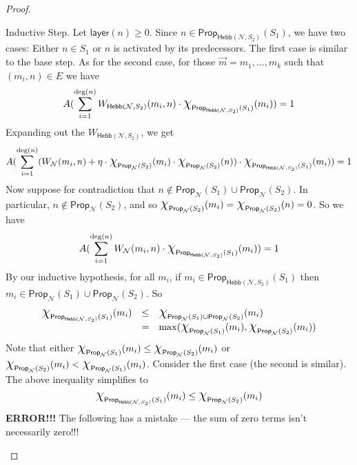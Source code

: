 \documentclass[letterpaper]{article}
\theoremstyle{definition}
\newcommand*{\bigchi}{\mbox{\Large$\chi$}}%
\newcommand{\degree}[1]{\mathrm{deg}(#1)}
\newcommand{\layer}[1]{\mathsf{layer}(#1)}
\newcommand{\Prop}{\textsf{Prop}}
\newcommand{\Hebb}{\textsf{Hebb}}
\newcommand{\Net}{\mathcal{N}}
\begin{document}
\begin{proof}
\begin{compactdesc}
\begin{compactdesc}
        \item[Inductive Step.] Let $\layer{n} \geq 0$.  Since $n \in \Prop_{\Hebb(\Net, S_2)}(S_1)$, we have two cases: Either $n \in S_1$ or $n$ is activated by its predecessors.  The first case is similar to the base step.  As for the second case, for those $\vec{m} = m_1, \ldots, m_k$ such that $(m_i, n) \in E$ we have
        \[
            A(\sum_{i=1}^{\degree{n}} W_{\Hebb(\Net, S_2)}(m_i, n) \cdot \bigchi_{\Prop_{\Hebb(\Net, S_2)}(S_1)}(m_i)) = 1
        \]
        Expanding out the $W_{\Hebb(\Net, S_2)}$, we get
        \[
            A(\sum_{i=1}^{\degree{n}} (W_{\Net}(m_i, n) + \eta \cdot \bigchi_{\Prop_{\Net}(S_2)}(m_i) \cdot \bigchi_{\Prop_{\Net}(S_2)}(n)) \cdot \bigchi_{\Prop_{\Hebb(\Net, S_2)}(S_1)}(m_i)) = 1
            \]
        Now suppose for contradiction that $n \not \in \Prop_{\Net}(S_1) \cup \Prop_{\Net}(S_2)$.  In particular, $n \not \in \Prop_{\Net}(S_2)$, and so $\bigchi_{\Prop_{\Net}(S_2)}(m_i) = \bigchi_{\Prop_{\Net}(S_2)}(n) = 0$.  So we have
        \[
            A(\sum_{i=1}^{\degree{n}} W_{\Net}(m_i, n) \cdot \bigchi_{\Prop_{\Hebb(\Net, S_2)}(S_1)}(m_i)) = 1
        \]
        By our inductive hypothesis, for all $m_i$, if $m_i \in \Prop_{\Hebb(\Net, S_2)}(S_1)$ then $m_i \in \Prop_{\Net}(S_1) \cup \Prop_{\Net}(S_2)$.  So
        \[
        \begin{array}{lcll}
            \bigchi_{\Prop_{\Hebb(\Net, S_2)}(S_1)}(m_i) 
            & \leq & \bigchi_{\Prop_{\Net}(S_1) \cup \Prop_{\Net}(S_2)}(m_i)\\
            & = & \max(\bigchi_{\Prop_{\Net}(S_1)}(m_i), \bigchi_{\Prop_{\Net}(S_2)}(m_i))
        \end{array}
        \]
        Note that either $\bigchi_{\Prop_{\Net}(S_1)}(m_i) \leq \bigchi_{\Prop_{\Net}(S_2)}(m_i)$ or $\bigchi_{\Prop_{\Net}(S_2)}(m_i) < \bigchi_{\Prop_{\Net}(S_1)}(m_i)$.  Consider the first case (the second is similar).  The above inequality simplifies to
        \[
            \bigchi_{\Prop_{\Hebb(\Net, S_2)}(S_1)}(m_i) \leq
            \bigchi_{\Prop_{\Net}(S_2)}(m_i)
        \]
        \textbf{ERROR!!!} The following has a mistake --- the sum of zero terms isn't necessarily zero!!!


\end{compactdesc}
\end{compactdesc}
\end{proof}
\end{document}
